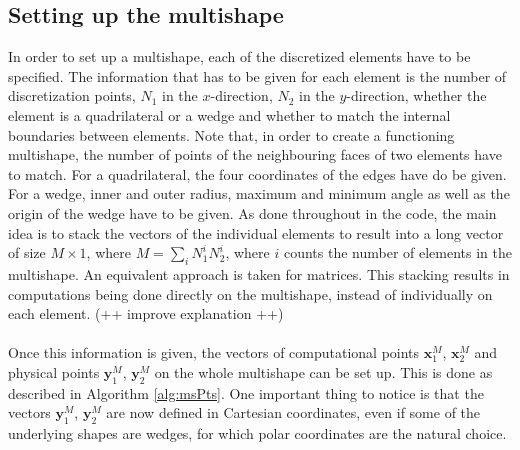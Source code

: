 \subsection{Setting up the multishape}
In order to set up a multishape, each of the discretized elements have to be specified. The information that has to be given for each element is the number of discretization points, $N_1$ in the $x$-direction, $N_2$ in the $y$-direction, whether the element is a quadrilateral or a wedge and whether to match the internal boundaries between elements. Note that, in order to create a functioning multishape, the number of points of the neighbouring faces of two elements have to match. For a quadrilateral, the four coordinates of the edges have do be given. For a wedge, inner and outer radius, maximum and minimum angle as well as the origin of the wedge have to be given. 
As done throughout in the code, the main idea is to stack the vectors of the individual elements to result into a long vector of size $M \times 1$, where $M = \sum_i N^i_1 N^i_2$, where $i$ counts the number of elements in the multishape. An equivalent approach is taken for matrices. This stacking results in computations being done directly on the multishape, instead of individually on each element. (++ improve explanation ++)
\\
\\
Once this information is given, the vectors of computational points $\mathbf x_1^M$, $\mathbf x_2^M$ and physical points $\mathbf y_1^M$, $\mathbf y_2^M$ on the whole multishape can be set up. This is done as described in Algorithm \ref{alg:msPts}.
 One important thing to notice is that the vectors $\mathbf y_1^M$, $\mathbf y_2^M$ are now defined in Cartesian coordinates, even if some of the underlying shapes are wedges, for which polar coordinates are the natural choice.
 \\

